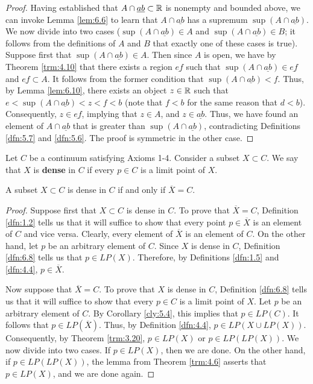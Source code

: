 \documentclass[../main.tex]{subfiles}
\begin{document}
\begin{exercise}
\begin{proof}
        Having established that $A\cap\underline{ab}\subset\mathbb{R}$ is nonempty and bounded above, we can invoke Lemma \ref{lem:6.6} to learn that $A\cap\underline{ab}$ has a supremum $\sup(A\cap\underline{ab})$. We now divide into two cases ($\sup(A\cap\underline{ab})\in A$ and $\sup(A\cap\underline{ab})\in B$; it follows from the definitions of $A$ and $B$ that exactly one of these cases is true). Suppose first that $\sup(A\cap\underline{ab})\in A$. Then since $A$ is open, we have by Theorem \ref{trm:4.10} that there exists a region $\underline{ef}$ such that $\sup(A\cap\underline{ab})\in\underline{ef}$ and $\underline{ef}\subset A$. It follows from the former condition that $\sup(A\cap\underline{ab})<f$. Thus, by Lemma \ref{lem:6.10}, there exists an object $z\in\mathbb{R}$ such that $e<\sup(A\cap\underline{ab})<z<f<b$ (note that $f<b$ for the same reason that $d<b$). Consequently, $z\in\underline{ef}$, implying that $z\in A$, and $z\in\underline{ab}$. Thus, we have found an element of $A\cap\underline{ab}$ that is greater than $\sup(A\cap\underline{ab})$, contradicting Definitions \ref{dfn:5.7} and \ref{dfn:5.6}. The proof is symmetric in the other case.
    \end{proof}
\end{exercise}

\begin{definition}\label{dfn:6.8}
    Let $C$ be a continuum satisfying Axioms 1-4. Consider a subset $X\subset C$. We say that $X$ is \textbf{dense} in $C$ if every $p\in C$ is a limit point of $X$.
\end{definition}

\begin{lemma}\label{lem:6.9}
    A subset $X\subset C$ is dense in $C$ if and only if $\overline{X}=C$.
    \begin{proof}
        Suppose first that $X\subset C$ is dense in $C$. To prove that $\overline{X}=C$, Definition \ref{dfn:1.2} tells us that it will suffice to show that every point $p\in\overline{X}$ is an element of $C$ and vice versa. Clearly, every element of $\overline{X}$ is an element of $C$. On the other hand, let $p$ be an arbitrary element of $C$. Since $X$ is dense in $C$, Definition \ref{dfn:6.8} tells us that $p\in LP(X)$. Therefore, by Definitions \ref{dfn:1.5} and \ref{dfn:4.4}, $p\in\overline{X}$.\par
        Now suppose that $\overline{X}=C$. To prove that $X$ is dense in $C$, Definition \ref{dfn:6.8} tells us that it will suffice to show that every $p\in C$ is a limit point of $X$. Let $p$ be an arbitrary element of $C$. By Corollary \ref{cly:5.4}, this implies that $p\in LP(C)$. It follows that $p\in LP(\overline{X})$. Thus, by Definition \ref{dfn:4.4}, $p\in LP(X\cup LP(X))$. Consequently, by Theorem \ref{trm:3.20}, $p\in LP(X)$ or $p\in LP(LP(X))$. We now divide into two cases. If $p\in LP(X)$, then we are done. On the other hand, if $p\in LP(LP(X))$, the lemma from Theorem \ref{trm:4.6} asserts that $p\in LP(X)$, and we are done again.
    \end{proof}
\end{lemma}
\end{document}
